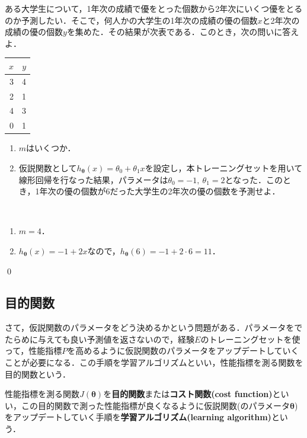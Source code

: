 \begin{qu}
ある大学生について，1年次の成績で優をとった個数から2年次にいくつ優をとるのか予測したい．そこで，何人かの大学生の1年次の成績の優の個数$x$と2年次の成績の優の個数$y$を集めた．その結果が次表である．このとき，次の問いに答えよ．
\begin{table}[H]
\centering
\begin{tabular}{rr}
\hline
$x$    & $y$   \\ \hline
3 & 4 \\
2 & 1 \\
4 & 3 \\
0  & 1 \\ \hline
\end{tabular}
\end{table}
\begin{enumerate}
\item $m$はいくつか．
\item 仮説関数として$h_{{\bm \theta}}(x)=\theta_0+\theta_1 x$を設定し，本トレーニングセットを用いて線形回帰を行なった結果，パラメータは$\theta_0=-1,~\theta_1=2$となった．このとき，1年次の優の個数が6だった大学生の2年次の優の個数を予測せよ．
\end{enumerate}
\end{qu}
\begin{ans}　
\begin{enumerate}
\item $m=4$．
\item $h_{{\bm \theta}}(x)=-1+2x$なので，$h_{{\bm \theta}}(6)=-1+2\cdot 6=11$．
\end{enumerate}
\qed	
\end{ans}

\subsection{目的関数}

さて，仮説関数のパラメータをどう決めるかという問題がある．パラメータをでたらめに与えても良い予測値を返さないので，経験$E$のトレーニングセットを使って，性能指標$P$を高めるように仮説関数のパラメータをアップデートしていくことが必要になる．この手順を学習アルゴリズムといい，性能指標を測る関数を目的関数という．

\begin{defi}
性能指標を測る関数$J({\bm \theta})$を{\bf 目的関数}または{\bf コスト関数(cost function)}といい，この目的関数で測った性能指標が良くなるように仮説関数(のパラメータ${\bm \theta}$)をアップデートしていく手順を{\bf 学習アルゴリズム(learning algorithm)}という．
\end{defi}

